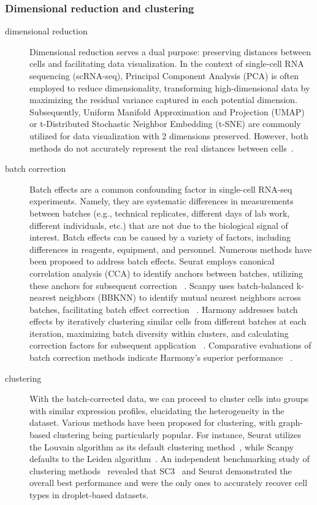 \subsubsection{Dimensional reduction and clustering}
\label{background:sec2:dr_n_clustering}
\begin{description}
	\item[dimensional reduction]
	Dimensional reduction serves a dual purpose: preserving distances between cells and facilitating data visualization. In the context of single-cell RNA sequencing (scRNA-seq), Principal Component Analysis (PCA)\citep{hotelling1933pca} is often employed to reduce dimensionality, transforming high-dimensional data by maximizing the residual variance captured in each potential dimension. Subsequently, Uniform Manifold Approximation and Projection (UMAP) or t-Distributed Stochastic Neighbor Embedding (t-SNE) are commonly utilized for data visualization with 2 dimensions preserved. However, both methods do not accurately represent the real distances between cells~\citep{mcinnes2018umap, van2008tsne}.

	\item[batch correction]
	Batch effects are a common confounding factor in single-cell RNA-seq experiments. Namely, they are systematic differences in measurements between batches (e.g., technical replicates, different days of lab work, different individuals, etc.) that are not due to the biological signal of interest. Batch effects can be caused by a variety of factors, including differences in reagents, equipment, and personnel. Numerous methods have been proposed to address batch effects. Seurat employs canonical correlation analysis (CCA) to identify anchors between batches, utilizing these anchors for subsequent correction ~\citep{stuart2019seurat3}. Scanpy uses batch-balanced k-nearest neighbors (BBKNN) to identify mutual nearest neighbors across batches, facilitating batch effect correction ~\citep{polanski2020bbknn}. Harmony addresses batch effects by iteratively clustering similar cells from different batches at each iteration, maximizing batch diversity within clusters, and calculating correction factors for subsequent application ~\citep{korsunsky2019harmony}. Comparative evaluations of batch correction methods indicate Harmony's superior performance ~\citep{tran2020benchmark}. 
	\item[clustering] 
	With the batch-corrected data, we can proceed to cluster cells into groups with similar expression profiles, elucidating the heterogeneity in the dataset. Various methods have been proposed for clustering, with graph-based clustering being particularly popular. For instance, Seurat utilizes the Louvain algorithm as its default clustering method~\citep{stuart2019seurat3}, while Scanpy defaults to the Leiden algorithm~\citep{traag2019louvain}. An independent benchmarking study of clustering methods~\citep{duo2018benchclustering} revealed that SC3~\citep{kiselev2017sc3} and Seurat demonstrated the overall best performance and were the only ones to accurately recover cell types in droplet-based datasets.	


\end{description}
